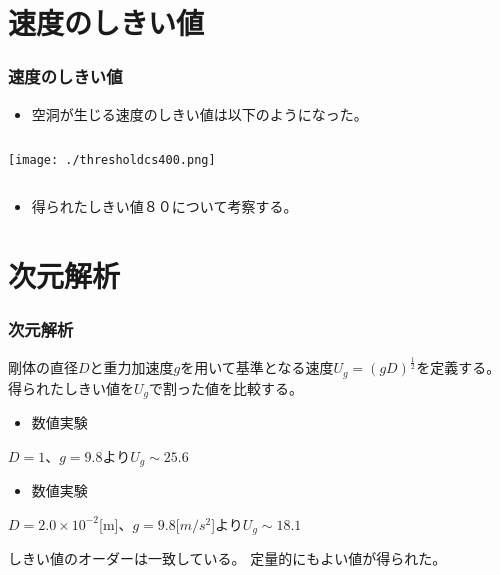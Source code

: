 \documentclass[12pt]{beamer}
\begin{document}
\section{速度のしきい値}
\begin{frame}\frametitle{速度のしきい値}
  \begin{itemize}
  \item 空洞が生じる速度のしきい値は以下のようになった。
  \end{itemize}
  \begin{columns}[t]
    \begin{column}{0.5\textwidth}
      \begin{center}
        \texttt{[image: ./thresholdcs400.png]}
      \end{center}
    \end{column}
  \end{columns}
  \begin{itemize}
    \item 得られたしきい値８０について考察する。
  \end{itemize}
\end{frame}

\section{次元解析}
\begin{frame}\frametitle{次元解析}
  剛体の直径$D$と重力加速度$g$を用いて基準となる速度$U_g=(gD)^{\frac{1}{2}}$を定義する。
  得られたしきい値を$U_g$で割った値を比較する。
  \begin{itemize}
  \item 数値実験
  \end{itemize}
  $D=1$、$g=9.8$より$U_g\sim25.6$
  \begin{itemize}
  \item 数値実験
  \end{itemize}
  $D=2.0\times10^{-2}$[m]、$g=9.8$[$m/s^2$]より$U_g\sim18.1$

  しきい値のオーダーは一致している。
  定量的にもよい値が得られた。
  
\end{frame}
\end{document}
